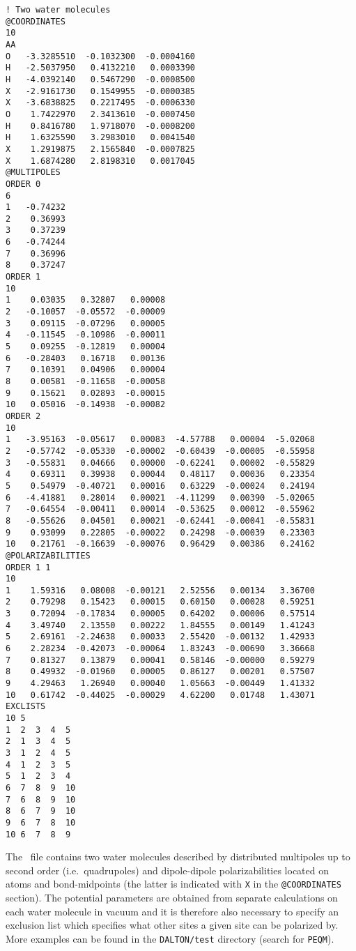 \begin{verbatim}
! Two water molecules
@COORDINATES
10
AA
O   -3.3285510  -0.1032300  -0.0004160
H   -2.5037950   0.4132210   0.0003390
H   -4.0392140   0.5467290  -0.0008500
X   -2.9161730   0.1549955  -0.0000385
X   -3.6838825   0.2217495  -0.0006330
O    1.7422970   2.3413610  -0.0007450
H    0.8416780   1.9718070  -0.0008200
H    1.6325590   3.2983010   0.0041540
X    1.2919875   2.1565840  -0.0007825
X    1.6874280   2.8198310   0.0017045
@MULTIPOLES
ORDER 0
6
1   -0.74232
2    0.36993
3    0.37239
6   -0.74244
7    0.36996
8    0.37247
ORDER 1
10
1    0.03035   0.32807   0.00008
2   -0.10057  -0.05572  -0.00009
3    0.09115  -0.07296   0.00005
4   -0.11545  -0.10986  -0.00011
5    0.09255  -0.12819   0.00004
6   -0.28403   0.16718   0.00136
7    0.10391   0.04906   0.00004
8    0.00581  -0.11658  -0.00058
9    0.15621   0.02893  -0.00015
10   0.05016  -0.14938  -0.00082
ORDER 2
10
1   -3.95163  -0.05617   0.00083  -4.57788   0.00004  -5.02068
2   -0.57742  -0.05330  -0.00002  -0.60439  -0.00005  -0.55958
3   -0.55831   0.04666   0.00000  -0.62241   0.00002  -0.55829
4    0.69311   0.39938   0.00044   0.48117   0.00036   0.23354
5    0.54979  -0.40721   0.00016   0.63229  -0.00024   0.24194
6   -4.41881   0.28014   0.00021  -4.11299   0.00390  -5.02065
7   -0.64554  -0.00411   0.00014  -0.53625   0.00012  -0.55962
8   -0.55626   0.04501   0.00021  -0.62441  -0.00041  -0.55831
9    0.93099   0.22805  -0.00022   0.24298  -0.00039   0.23303
10   0.21761  -0.16639  -0.00076   0.96429   0.00386   0.24162
@POLARIZABILITIES
ORDER 1 1
10
1    1.59316   0.08008  -0.00121   2.52556   0.00134   3.36700
2    0.79298   0.15423   0.00015   0.60150   0.00028   0.59251
3    0.72094  -0.17834   0.00005   0.64202   0.00006   0.57514
4    3.49740   2.13550   0.00222   1.84555   0.00149   1.41243
5    2.69161  -2.24638   0.00033   2.55420  -0.00132   1.42933
6    2.28234  -0.42073  -0.00064   1.83243  -0.00690   3.36668
7    0.81327   0.13879   0.00041   0.58146  -0.00000   0.59279
8    0.49932  -0.01960   0.00005   0.86127   0.00201   0.57507
9    4.29463   1.26940   0.00040   1.05663  -0.00449   1.41332
10   0.61742  -0.44025  -0.00029   4.62200   0.01748   1.43071
EXCLISTS
10 5
1  2  3  4  5
2  1  3  4  5
3  1  2  4  5
4  1  2  3  5
5  1  2  3  4
6  7  8  9  10
7  6  8  9  10
8  6  7  9  10
9  6  7  8  10
10 6  7  8  9
\end{verbatim}
The \potinp\ file contains two water molecules described by distributed 
multipoles up to second order (i.e.\ quadrupoles) and dipole-dipole polarizabilities
located on atoms and bond-midpoints (the latter is indicated with \verb|X| in the \verb|@COORDINATES|
section). The potential parameters are obtained from separate calculations on each 
water molecule in vacuum and it is therefore also necessary to specify 
an exclusion list which specifies what other sites a given site can be polarized by.
More examples can be found in the \verb|DALTON/test| directory (search for 
\verb|PEQM|).

